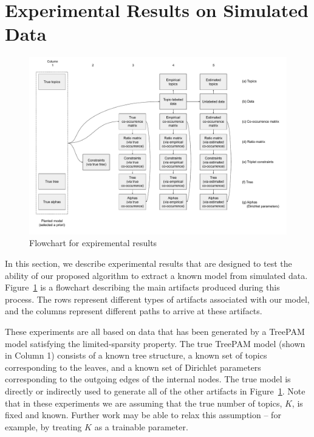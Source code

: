 \documentclass{article}
\theoremstyle{definition}
\begin{document}
\section{Experimental Results on Simulated Data}

\begin{figure}[hbt]
    \centering
    \includegraphics[width=\textwidth]{figures/experiment-flowchart.pdf}
    \caption{Flowchart for expiremental results}
    \label{fig:experiment-flowchart}
\end{figure}

In this section, we describe experimental results that are designed to test the ability of our proposed algorithm to extract a known model from simulated data.
Figure~\ref{fig:experiment-flowchart} is a flowchart describing the main artifacts produced during this process.
The rows represent different types of artifacts associated with our model, and the columns represent different paths to arrive at these artifacts.

These experiments are all based on data that has been generated by a TreePAM model satisfying the limited-sparsity property.
The true TreePAM model (shown in Column 1) consists of a known tree structure, a known set of topics corresponding to the leaves, and a known set of Dirichlet parameters corresponding to the outgoing edges of the internal nodes.
The true model is directly or indirectly used to generate all of the other artifacts in Figure~\ref{fig:experiment-flowchart}.
Note that in these experiments we are assuming that the true number of topics, $K$, is fixed and known.
Further work may be able to relax this assumption -- for example, by treating $K$ as a trainable parameter.
\end{document}
